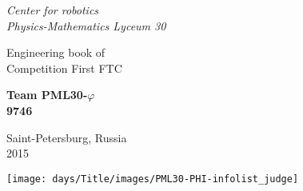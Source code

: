 \thispagestyle{titlestyle}
\begin{titlepage}
	
	\begin{center}
		\LARGE\textit{Center for robotics \\ Physics-Mathematics Lyceum 30}
        \begin{figure}[H]
        \end{figure}
		\vspace{3em}
		
		\LARGE{Engineering book of \\ Competition First FTC}
		
		\vspace{2em}
		
		\bf\fontsize{50}{60}\selectfont Team PML30-${\varphi}$ \\ 9746 \fontsize{11}{13}\selectfont
			
	\vspace{6em}
		
		\begin{figure}[H]
		\end{figure}
			
		\LARGE\normalfont Saint-Petersburg, Russia	\\ 2015
	\end{center}
\end{titlepage}

\newpage

\texttt{[image: days/Title/images/PML30-PHI-infolist\_judge]}
